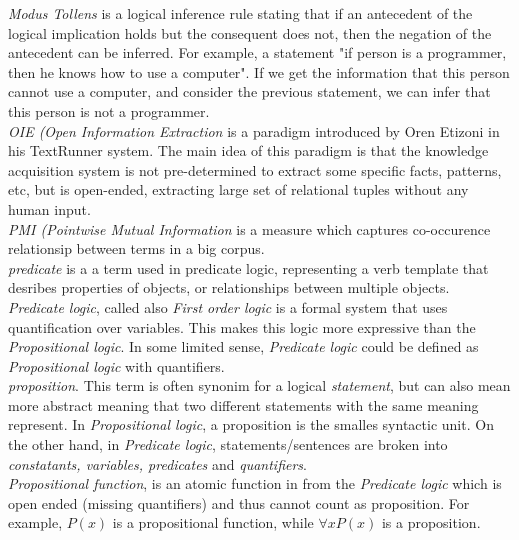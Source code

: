 \emph{Modus Tollens} is a logical inference rule stating that if an antecedent
of the logical implication holds but the consequent does not, then the negation
of the antecedent can be inferred. For example, a statement "if person is a 
programmer, then he knows how to use a computer". If we get the information
that this person cannot use a computer, and consider the previous statement, we
can infer that this person is not a programmer. \\

\emph{OIE (Open Information Extraction} is a paradigm introduced by Oren Etizoni
in his TextRunner system. The main idea of this paradigm is that the knowledge 
acquisition system is not pre-determined to extract some specific facts, 
patterns, etc, but is open-ended, extracting large set of relational tuples 
without any human input.\\

\emph{PMI (Pointwise Mutual Information} is a measure which captures 
co-occurence relationsip between terms in a big corpus.\\

\emph{predicate} is a a term used in predicate logic, representing a verb
template that desribes properties of objects, or relationships between multiple
objects.\\

\emph{Predicate logic}, called also \emph{First order logic} is a formal system
that uses quantification over variables. This makes this logic more expressive
than the \emph{Propositional logic}. In some limited sense, 
\emph{Predicate logic} could be defined as \emph{Propositional logic} with 
quantifiers.\\

\emph{proposition}. This term is often synonim for a logical \emph{statement},
but can also mean more abstract meaning that two different statements with the
same meaning represent. In \emph{Propositional logic}, a proposition is the
smalles syntactic unit. On the other hand, in \emph{Predicate logic}, 
statements/sentences are broken into \emph{constatants, variables, predicates}
and \emph{quantifiers}.\\

\emph{Propositional function}, is an atomic function in from the 
\emph{Predicate logic} which is open ended (missing quantifiers) and thus
cannot count as proposition. For example, $P(x)$ is a propositional function,
while $\forall x P(x)$ is a proposition.\\

